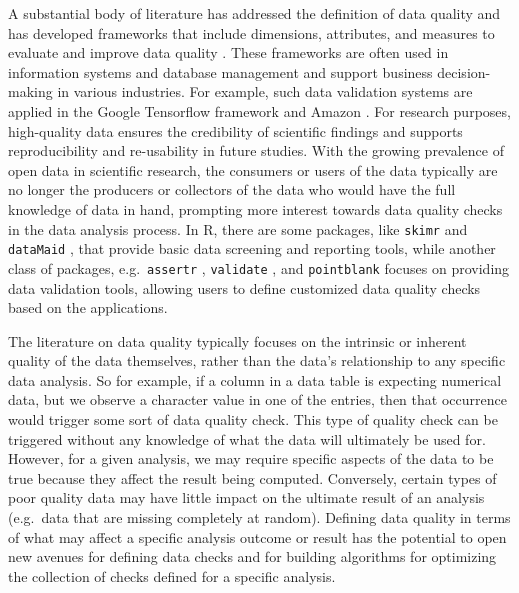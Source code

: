 \documentclass[
  12pt,
]{interact}
\begin{document}
A substantial body of literature has addressed the definition of data
quality and has developed frameworks that include dimensions,
attributes, and measures to evaluate and improve data quality
\citep{8642813, batini2009methodologies, cai2015challenges, wang1996beyond, 6204995, woodall2014classification}.
These frameworks are often used in information systems and database
management and support business decision-making in various industries.
For example, such data validation systems are applied in the Google
Tensorflow framework \citep{polyzotis2019data} and Amazon
\citep{schelter2018automating}. For research purposes, high-quality data
ensures the credibility of scientific findings and supports
reproducibility and re-usability in future studies. With the growing
prevalence of open data in scientific research, the consumers or users
of the data typically are no longer the producers or collectors of the
data who would have the full knowledge of data in hand, prompting more
interest towards data quality checks in the data analysis process. In R,
there are some packages, like \texttt{skimr} \citep{skimr} and
\texttt{dataMaid} \citep{dataMaid}, that provide basic data screening
and reporting tools, while another class of packages,
e.g.~\texttt{assertr} \citep{assertr}, \texttt{validate}
\citep{validate}, and \texttt{pointblank} \citep{pointblank} focuses on
providing data validation tools, allowing users to define customized
data quality checks based on the applications.

The literature on data quality typically focuses on the intrinsic or
inherent quality of the data themselves, rather than the data's
relationship to any specific data analysis. So for example, if a column
in a data table is expecting numerical data, but we observe a character
value in one of the entries, then that occurrence would trigger some
sort of data quality check. This type of quality check can be triggered
without any knowledge of what the data will ultimately be used for.
However, for a given analysis, we may require specific aspects of the
data to be true because they affect the result being computed.
Conversely, certain types of poor quality data may have little impact on
the ultimate result of an analysis (e.g.~data that are missing
completely at random). Defining data quality in terms of what may affect
a specific analysis outcome or result has the potential to open new
avenues for defining data checks and for building algorithms for
optimizing the collection of checks defined for a specific analysis.
\end{document}
